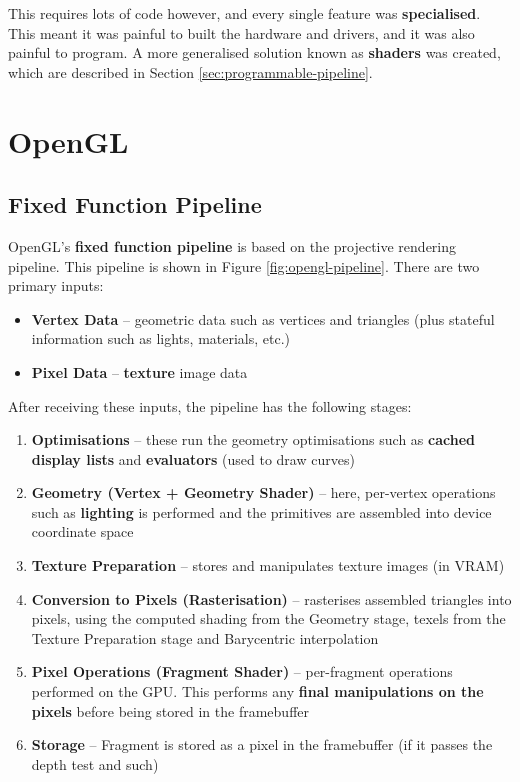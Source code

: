\documentclass{article}
\begin{document}
This requires lots of code however, and every single feature was \textbf{specialised}. This meant it was painful to built the hardware and drivers, and it was also painful to program. A more generalised solution known as \textbf{shaders} was created, which are described in Section \ref{sec:programmable-pipeline}.

\section{OpenGL}

\subsection{Fixed Function Pipeline}
\label{sec:opengl-pipeline}

OpenGL's \textbf{fixed function pipeline} is based on the projective rendering pipeline. This pipeline is shown in Figure \ref{fig:opengl-pipeline}. There are two primary inputs:
\begin{itemize}
	\item \textbf{Vertex Data} -- geometric data such as vertices and triangles (plus stateful information such as lights, materials, etc.)
	\item \textbf{Pixel Data} -- \textbf{texture} image data
\end{itemize}

After receiving these inputs, the pipeline has the following stages:
\begin{enumerate}
	\item \textbf{Optimisations} -- these run the geometry optimisations such as \textbf{cached display lists} and \textbf{evaluators} (used to draw curves)
	\item \textbf{Geometry (Vertex + Geometry Shader)} -- here, per-vertex operations such as \textbf{lighting} is performed and the primitives are assembled into device coordinate space
	\item \textbf{Texture Preparation} -- stores and manipulates texture images (in VRAM)
	\item \textbf{Conversion to Pixels (Rasterisation)} -- rasterises assembled triangles into pixels, using the computed shading from the Geometry stage, texels from the Texture Preparation stage and Barycentric interpolation
	\item \textbf{Pixel Operations (Fragment Shader)} -- per-fragment operations performed on the GPU. This performs any \textbf{final manipulations on the pixels} before being stored in the framebuffer
	\item \textbf{Storage} -- Fragment is stored as a pixel in the framebuffer (if it passes the depth test and such)
\end{enumerate}
\end{document}
